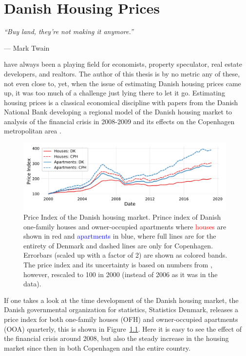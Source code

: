 
\chapter{Danish Housing Prices}
\label{ch:housing_price_analysis}
\epigraph{\textit{``Buy land, they’re not making it anymore.''}}{--- Mark Twain}
 have always been a playing field for economists, property speculator, real estate developers, and realtors. The author of this thesis is by no metric any of these, not even close to, yet, when the issue of estimating Danish housing prices came up, it was too much of a challenge just lying there to let it go. Estimating housing prices is a classical economical discipline with papers from the Danish National Bank developing a regional model of the Danish housing market \autocite{hviidWorkingPaperRegional2017} to analysis of the financial crisis in 2008-2009 and its effects on the Copenhagen metropolitan area \autocite{mulalicFinancialCrisisDiverging2017}. 

\begin{figure}
  \includegraphics[width=0.98\textwidth, trim=10 20 10 10, clip]{figures/housing_price_index_dst/housingindex_wide.pdf}
  \caption[Danish Housing Price Index]
          {Price Index of the Danish housing market. Prince index of Danish one-family houses and owner-occupied apartments where \textcolor{red}{houses} are shown in red and \textcolor{blue}{apartments} in blue, where full lines are for the entirety of Denmark and dashed lines are only for Copenhagen. Errorbars (scaled up with a factor of 2) are shown as colored bands. The price index and its uncertainty is based on numbers from \citet{dstPriceIndexEJ14}, however, rescaled to 100 in 2000 (instead of 2006 as it was in the data).}
  \label{fig:h:price_index}
\end{figure}

If one takes a look at the time development of the Danish housing market, the Danish governmental organization for statistics, Statistics Denmark, releases a price index \citep{dstPriceIndexEJ14} for both one-family houses (OFH) and owner-occupied apartments (OOA) quarterly, this is shown in Figure~\ref{fig:h:price_index}. Here it is easy to see the effect of the financial crisis around 2008, but also the steady increase in the housing market since then in both Copenhagen and the entire country. 


